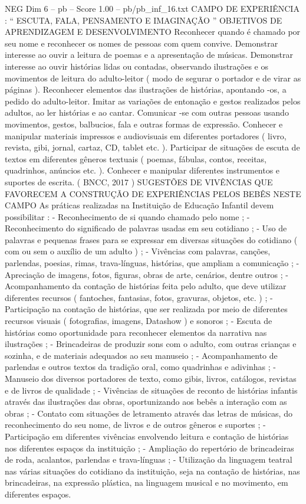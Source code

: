 \begin{textsample}{NEG Dim 6 – pb – Score 1.00 – pb/pb\_inf\_16.txt}  \label{ex:f6_neg_083}
CAMPO DE EXPERIÊNCIA : “ ESCUTA, FALA, PENSAMENTO E IMAGINAÇÃO ” OBJETIVOS DE APRENDIZAGEM E DESENVOLVIMENTO Reconhecer quando é chamado por seu nome e reconhecer os nomes de pessoas com quem convive.
Demonstrar interesse ao ouvir a leitura de poemas e a apresentação de músicas.
Demonstrar interesse ao ouvir histórias lidas ou contadas, observando ilustrações e os movimentos de leitura do adulto-leitor ( modo de segurar o portador e de virar as páginas ).
Reconhecer elementos das ilustrações de histórias, apontando -os, a pedido do adulto-leitor.
Imitar as variações de entonação e gestos realizados pelos adultos, ao ler histórias e ao cantar.
Comunicar -se com outras pessoas usando movimentos, gestos, balbucios, fala e outras formas de expressão.
Conhecer e manipular materiais impressos e audiovisuais em diferentes portadores ( livro, revista, gibi, jornal, cartaz, CD, tablet etc. ).
Participar de situações de escuta de textos em diferentes gêneros textuais ( poemas, fábulas, contos, receitas, quadrinhos, anúncios etc. ).
Conhecer e manipular diferentes instrumentos e suportes de escrita. ( BNCC, 2017 ) SUGESTÕES DE VIVÊNCIAS QUE FAVORECEM A CONSTRUÇÃO DE EXPERIÊNCIAS PELOS BEBÊS NESTE CAMPO As práticas realizadas na Instituição de Educação Infantil devem possibilitar : - Reconhecimento de si quando chamado pelo nome ; - Reconhecimento do significado de palavras usadas em seu cotidiano ; - Uso de palavras e pequenas frases para se expressar em diversas situações do cotidiano ( com ou sem o auxílio de um adulto ) ; - Vivências com palavras, canções, parlendas, poesias, rimas, trava-línguas, histórias, que ampliam a comunicação ; - Apreciação de imagens, fotos, figuras, obras de arte, cenários, dentre outros ; - Acompanhamento da contação de histórias feita pelo adulto, que deve utilizar diferentes recursos ( fantoches, fantasias, fotos, gravuras, objetos, etc. ) ; - Participação na contação de histórias, que ser realizada por meio de diferentes recursos visuais ( fotografias, imagens, Datashow ) e sonoros ; - Escuta de histórias como oportunidade para reconhecer elementos da narrativa nas ilustrações ; - Brincadeiras de produzir sons com o adulto, com outras crianças e sozinha, e de materiais adequados ao seu manuseio ; - Acompanhamento de parlendas e outros textos da tradição oral, como quadrinhas e adivinhas ; - Manuseio dos diversos portadores de texto, como gibis, livros, catálogos, revistas e de livros de qualidade ; - Vivências de situações de reconto de histórias infantis através das ilustrações das obras, oportunizando aos bebês a interação com as obras ; - Contato com situações de letramento através das letras de músicas, do reconhecimento do seu nome, de livros e de outros gêneros e suportes ; - Participação em diferentes vivências envolvendo leitura e contação de histórias nos diferentes espaços da instituição ; - Ampliação do repertório de brincadeiras de roda, acalantos, parlendas e trava-línguas ; - Utilização da linguagem teatral nas várias situações do cotidiano da instituição, seja na contação de histórias, nas brincadeiras, na expressão plástica, na linguagem musical e no movimento, em diferentes espaços.

\end{textsample}
